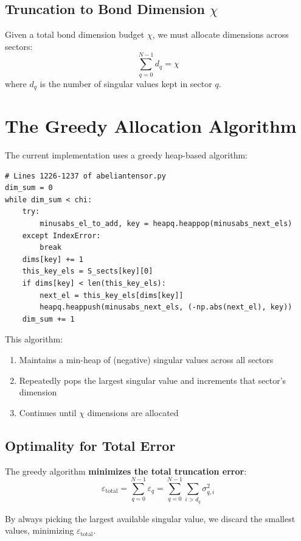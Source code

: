 \documentclass{article}
\begin{document}
\subsection{Truncation to Bond Dimension $\chi$}

Given a total bond dimension budget $\chi$, we must allocate dimensions across sectors:
\begin{equation}
    \sum_{q=0}^{N-1} d_q = \chi
\end{equation}
where $d_q$ is the number of singular values kept in sector $q$.

\section{The Greedy Allocation Algorithm}

The current implementation uses a greedy heap-based algorithm:

\begin{lstlisting}
# Lines 1226-1237 of abeliantensor.py
dim_sum = 0
while dim_sum < chi:
    try:
        minusabs_el_to_add, key = heapq.heappop(minusabs_next_els)
    except IndexError:
        break
    dims[key] += 1
    this_key_els = S_sects[key][0]
    if dims[key] < len(this_key_els):
        next_el = this_key_els[dims[key]]
        heapq.heappush(minusabs_next_els, (-np.abs(next_el), key))
    dim_sum += 1
\end{lstlisting}

This algorithm:
\begin{enumerate}
    \item Maintains a min-heap of (negative) singular values across all sectors
    \item Repeatedly pops the largest singular value and increments that sector's dimension
    \item Continues until $\chi$ dimensions are allocated
\end{enumerate}

\subsection{Optimality for Total Error}

The greedy algorithm \textbf{minimizes the total truncation error}:
\begin{equation}
    \varepsilon_{\text{total}} = \sum_{q=0}^{N-1} \varepsilon_q = \sum_{q=0}^{N-1} \sum_{i > d_q} \sigma_{q,i}^2
\end{equation}

By always picking the largest available singular value, we discard the smallest values, minimizing $\varepsilon_{\text{total}}$.
\end{document}
